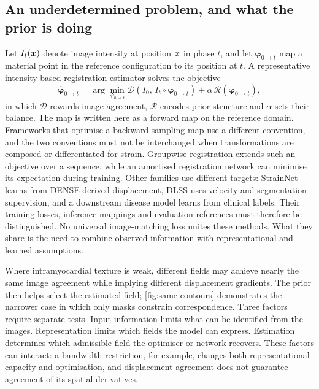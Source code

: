 \subsection{An underdetermined problem, and what the prior is doing}\label{sec:illposed}

Let \(I_t(\bm{x})\) denote image intensity at position \(\bm{x}\) in phase \(t\), and let \(\boldsymbol\varphi_{0\rightarrow t}\) map a material point in the reference configuration to its position at \(t\). A representative intensity-based registration estimator solves the objective
\begin{equation}
\widehat{\boldsymbol\varphi}_{0\rightarrow t}
=\arg\min_{\boldsymbol\varphi_{0\rightarrow t}}
\mathcal D\!\left(I_0,\,I_t\circ\boldsymbol\varphi_{0\rightarrow t}\right)
+\alpha\,\mathcal R(\boldsymbol\varphi_{0\rightarrow t}),
\label{eq:registration}
\end{equation}
in which \(\mathcal D\) rewards image agreement, \(\mathcal R\) encodes prior structure and \(\alpha\) sets their balance. The map is written here as a forward map on the reference domain. Frameworks that optimise a backward sampling map use a different convention, and the two conventions must not be interchanged when transformations are composed or differentiated for strain. Groupwise registration extends such an objective over a sequence, while an amortised registration network can minimise its expectation during training. Other families use different targets: StrainNet learns from DENSE-derived displacement, DLSS uses velocity and segmentation supervision, and a downstream disease model learns from clinical labels. Their training losses, inference mappings and evaluation references must therefore be distinguished. No universal image-matching loss unites these methods. What they share is the need to combine observed information with representational and learned assumptions.

Where intramyocardial texture is weak, different fields may achieve nearly the same image agreement while implying different displacement gradients. The prior then helps select the estimated field; \cref{fig:same-contours} demonstrates the narrower case in which only masks constrain correspondence. Three factors require separate tests. Input information limits what can be identified from the images. Representation limits which fields the model can express. Estimation determines which admissible field the optimiser or network recovers. These factors can interact: a bandwidth restriction, for example, changes both representational capacity and optimisation, and displacement agreement does not guarantee agreement of its spatial derivatives.

